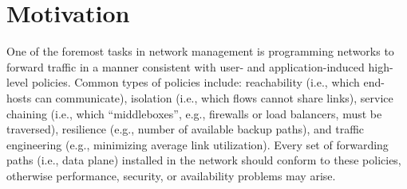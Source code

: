 \section{Motivation} \label{sec:motivation}


One of the foremost tasks in network management is programming 
networks to forward traffic in a manner consistent with user- and
application-induced high-level policies. Common types of policies
include: reachability (i.e., which end-hosts can communicate),
isolation (i.e., which flows cannot share links), service chaining
(i.e., which ``middleboxes'', e.g., firewalls or load
balancers, must be traversed), resilience (e.g., number of available backup paths), and traffic engineering (e.g., minimizing average
link utilization). Every set of forwarding paths (i.e., data plane)
installed in the network
should conform to these 
policies, otherwise performance, security, or availability problems may arise.

